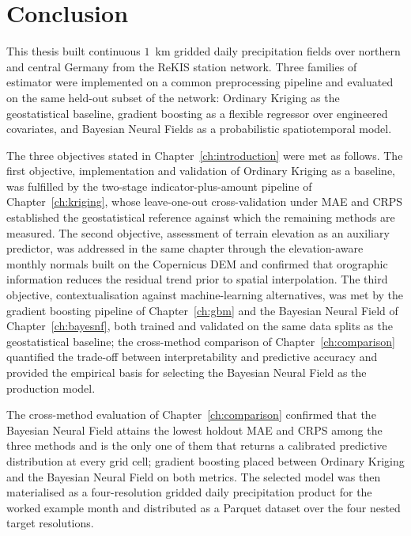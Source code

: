 \chapter{Conclusion}
\label{ch:conclusion}

This thesis built continuous $1$~km gridded daily precipitation
fields over northern and central Germany from the ReKIS station
network. Three families of estimator were implemented on a common
preprocessing pipeline and evaluated on the same held-out subset of
the network: Ordinary Kriging as the geostatistical baseline,
gradient boosting as a flexible regressor over engineered covariates,
and Bayesian Neural Fields as a probabilistic spatiotemporal model.

The three objectives stated in Chapter~\ref{ch:introduction} were
met as follows. The first objective, implementation and validation
of Ordinary Kriging as a baseline, was fulfilled by the two-stage
indicator-plus-amount pipeline of Chapter~\ref{ch:kriging}, whose
leave-one-out cross-validation under MAE and CRPS established the
geostatistical reference against which the remaining methods are
measured. The second objective, assessment of terrain elevation
as an auxiliary predictor, was addressed in the same chapter
through the elevation-aware monthly normals built on the Copernicus
DEM and confirmed that orographic information reduces the residual
trend prior to spatial interpolation. The third objective,
contextualisation against machine-learning alternatives, was met
by the gradient boosting pipeline of Chapter~\ref{ch:gbm}
and the Bayesian Neural Field of Chapter~\ref{ch:bayesnf}, both
trained and validated on the same data splits as the geostatistical
baseline; the cross-method comparison of Chapter~\ref{ch:comparison}
quantified the trade-off between interpretability and predictive
accuracy and provided the empirical basis for selecting the
Bayesian Neural Field as the production model.

The cross-method evaluation of Chapter~\ref{ch:comparison} confirmed
that the Bayesian Neural Field attains the lowest holdout MAE and CRPS
among the three methods and is the only one of them that returns a
calibrated predictive distribution at every grid cell; gradient
boosting placed between Ordinary Kriging and the Bayesian Neural Field
on both metrics. The selected model was then materialised as a
four-resolution gridded daily precipitation product for the worked
example month and distributed as a Parquet dataset over the four
nested target resolutions.

